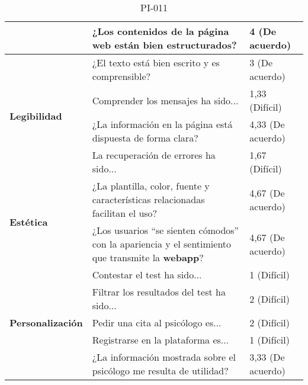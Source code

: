 \begin{table}[htpb]
\begin{tabularx}{\textwidth}{|l|X|l|}
                                          & ¿Los contenidos de la página web están bien estructurados?                                                          & 4 (De acuerdo)      \\ \hline
\multirow{4}{*}{\textbf{Legibilidad}}     & ¿El texto está bien escrito y es comprensible?                                                                      & 3 (De acuerdo)      \\ \cline{2-3} 
                                          & Comprender los mensajes ha sido...                                                                                  & 1,33 (Difícil)      \\ \cline{2-3} 
                                          & ¿La información en la página está dispuesta de forma clara?                                                         & 4,33 (De acuerdo)   \\ \cline{2-3} 
                                          & La recuperación de errores ha sido...                                                                               & 1,67 (Difícil)      \\ \hline
\multirow{2}{*}{\textbf{Estética}}        & ¿La plantilla, color, fuente y características relacionadas facilitan el uso?                                       & 4,67 (De acuerdo)   \\ \cline{2-3} 
                                          & ¿Los usuarios “se sienten cómodos” con la apariencia y el sentimiento que transmite la \textbf{webapp}?                      & 4,67 (De acuerdo)   \\ \hline
\multirow{5}{*}{\textbf{Personalización}} & Contestar el test ha sido...                                                                                        & 1 (Difícil)         \\ \cline{2-3} 
                                          & Filtrar los resultados del test ha sido...                                                                          & 2 (Difícil)         \\ \cline{2-3} 
                                          & Pedir una cita al psicólogo es...                                                                                   & 2 (Difícil)         \\ \cline{2-3} 
                                          & Registrarse en la plataforma es...                                                                                  & 1 (Difícil)         \\ \cline{2-3} 
                                          & ¿La información mostrada sobre el psicólogo me resulta de utilidad?                                                 & 3,33 (De acuerdo)   \\ \hline
\end{tabularx}
\caption{PI-011}
\end{table}


